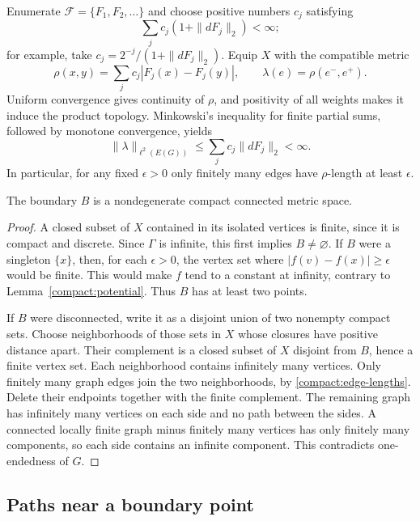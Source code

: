 Enumerate $\mathcal F=\{F_1,F_2,\ldots\}$ and choose positive numbers
$c_j$ satisfying
\[
 \sum_j c_j(1+\|dF_j\|_2)<\infty;
\]
for example, take $c_j=2^{-j}/(1+\|dF_j\|_2)$.  Equip $X$ with the
compatible metric
\begin{equation}\label{compact:metric}
 \rho(x,y)=\sum_j c_j|F_j(x)-F_j(y)|,
 \qquad \lambda(e)=\rho(e^-,e^+).
\end{equation}
Uniform convergence gives continuity of $\rho$, and positivity of all
weights makes it induce the product topology.  Minkowski's inequality
for finite partial sums, followed by monotone convergence, yields
\begin{equation}\label{compact:edge-lengths}
 \|\lambda\|_{\ell^2(E(G))}
 \le\sum_j c_j\|dF_j\|_2<\infty.
\end{equation}
In particular, for any fixed $\epsilon>0$ only finitely many edges have
$\rho$-length at least $\epsilon$.

\begin{lemma}\label{compact:boundary}
The boundary $B$ is a nondegenerate compact connected metric space.
\end{lemma}

\begin{proof}
A closed subset of $X$ contained in its isolated vertices is finite,
since it is compact and discrete.  Since $\Gamma$ is infinite, this
first implies $B\ne\varnothing$.  If $B$ were a singleton $\{x\}$,
then, for each $\epsilon>0$, the vertex set where
$|f(v)-f(x)|\ge\epsilon$ would be finite.  This would make $f$ tend to
a constant at infinity, contrary to Lemma~\ref{compact:potential}.
Thus $B$ has at least two points.

If $B$ were disconnected, write it as a disjoint union of two
nonempty compact sets.  Choose neighborhoods of those sets in $X$
whose closures have positive distance apart.  Their complement is a
closed subset of $X$ disjoint from $B$, hence a finite vertex set.
Each neighborhood contains infinitely many vertices.  Only finitely
many graph edges join the two neighborhoods, by
\eqref{compact:edge-lengths}.  Delete their endpoints together with
the finite complement.  The remaining graph has infinitely many
vertices on each side and no path between the sides.  A connected
locally finite graph minus finitely many vertices has only finitely
many components, so each side contains an infinite component.  This
contradicts one-endedness of $G$.
\end{proof}

\subsection{Paths near a boundary point}

